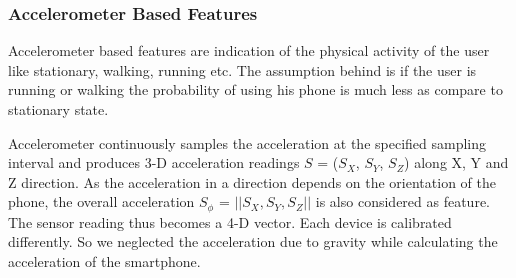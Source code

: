 \subsubsection{Accelerometer Based Features}
Accelerometer based features are indication of the physical 
activity of the user like stationary, walking, running etc. The assumption behind is if the 
user is running or walking the probability of using his phone is much less as compare to 
stationary state.

Accelerometer continuously samples the acceleration at the specified sampling interval and produces 3-D acceleration readings $S$ = ($S_X$, $S_Y$, $S_Z$) along X, Y and Z direction. As the acceleration in a direction depends on the orientation of the phone, the overall acceleration $S_\phi$ = $||S_X, S_Y, S_Z||$ is also considered as feature. The sensor reading thus becomes a 4-D vector. 
Each device is calibrated differently. So we neglected the acceleration due to gravity while calculating the acceleration of the smartphone.

